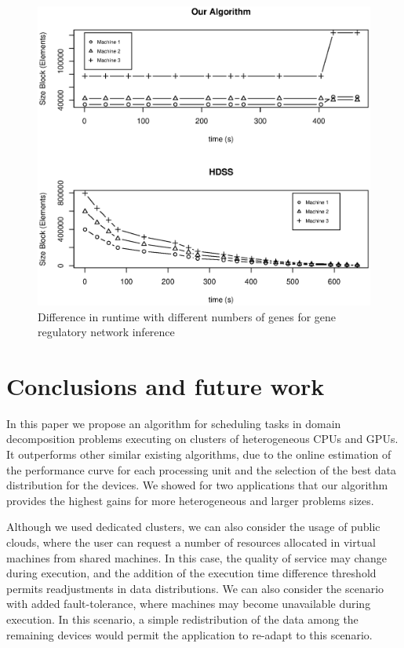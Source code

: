 \documentclass[journal]{IEEEtran}
\begin{document}
\begin{figure}[htb]
	\begin{center}
	\centering
			\includegraphics[scale=0.4]{BlocosComportamento_Fabrizio.eps}
	\caption{Difference in runtime with different numbers of genes for gene regulatory network inference}
	\label{fig:GeneBlocos}
	\end{center}
\end{figure}


\section{Conclusions and future work}

In this paper we propose an algorithm for scheduling tasks in domain
decomposition problems executing on clusters of heterogeneous CPUs and GPUs. It
outperforms other similar existing algorithms, due to the online estimation of
the performance curve for each processing unit and the selection of the best
data distribution for the devices. We showed for two applications that our
algorithm provides the highest gains for more heterogeneous and larger problems
sizes.

Although we used dedicated clusters, we can also consider the usage of public
clouds, where the user can request a number of resources allocated in virtual
machines from shared machines. In this case, the quality of service may change
during execution, and the addition of the execution time difference threshold
permits readjustments in data distributions. We can also consider the scenario
with added fault-tolerance, where machines may become unavailable during
execution. In this scenario, a simple redistribution of the data among the
remaining devices would permit the application to re-adapt to this scenario.
\end{document}
